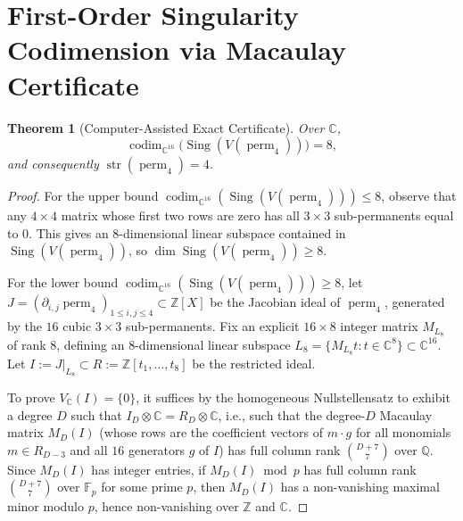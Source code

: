\documentclass[11pt,a4paper]{article}
\newtheorem{theorem}{Theorem}[section]
\theoremstyle{definition}
\DeclareMathOperator{\perm}{perm}
\DeclareMathOperator{\codim}{codim}
\DeclareMathOperator{\Sing}{Sing}
\DeclareMathOperator{\str}{str}
\begin{document}
\section{First-Order Singularity Codimension via Macaulay Certificate}\label{sec:cert}

\begin{theorem}[Computer-Assisted Exact Certificate]\label{thm:sing1}
Over $\mathbb{C}$,
\[
  \codim_{\mathbb{C}^{16}}\big(\Sing(V(\perm_4))\big) = 8,
\]
and consequently $\str(\perm_4) = 4$.
\end{theorem}

\begin{proof}
For the upper bound $\codim_{\mathbb{C}^{16}}(\Sing(V(\perm_4))) \le 8$, observe that any $4 \times 4$ matrix whose first two rows are zero has all $3 \times 3$ sub-permanents equal to $0$. This gives an $8$-dimensional linear subspace contained in $\Sing(V(\perm_4))$, so $\dim \Sing(V(\perm_4)) \ge 8$.

For the lower bound $\codim_{\mathbb{C}^{16}}(\Sing(V(\perm_4))) \ge 8$, let $J = (\partial_{i,j}\perm_4)_{1\le i,j\le 4} \subset \mathbb{Z}[X]$ be the Jacobian ideal of $\perm_4$, generated by the $16$ cubic $3 \times 3$ sub-permanents. Fix an explicit $16 \times 8$ integer matrix $M_{L_8}$ of rank $8$, defining an $8$-dimensional linear subspace $L_8 = \{M_{L_8} t : t \in \mathbb{C}^8\} \subset \mathbb{C}^{16}$. Let $I := J|_{L_8} \subset R := \mathbb{Z}[t_1,\dots,t_8]$ be the restricted ideal.

To prove $V_{\mathbb{C}}(I) = \{0\}$, it suffices by the homogeneous Nullstellensatz to exhibit a degree $D$ such that $I_D \otimes \mathbb{C} = R_D \otimes \mathbb{C}$, i.e., such that the degree-$D$ Macaulay matrix $M_D(I)$ (whose rows are the coefficient vectors of $m \cdot g$ for all monomials $m \in R_{D-3}$ and all $16$ generators $g$ of $I$) has full column rank $\binom{D+7}{7}$ over $\mathbb{Q}$. Since $M_D(I)$ has integer entries, if $M_D(I) \bmod p$ has full column rank $\binom{D+7}{7}$ over $\mathbb{F}_p$ for some prime $p$, then $M_D(I)$ has a non-vanishing maximal minor modulo $p$, hence non-vanishing over $\mathbb{Z}$ and $\mathbb{C}$.


\end{proof}
\end{document}

